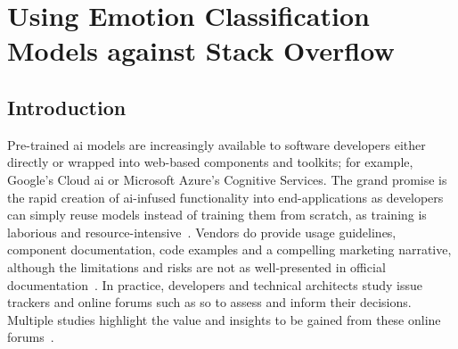 \chapter[Using Emotion Classification Models against Stack Overlow]
{Using Emotion Classification Models against Stack Overflow}
\label{ch:caise2021}
\graphicspath{{mainmatter/publications/figures/caise2021/}}

\glsresetall
\begin{abstract}
Pre-trained \gls{ai} models are increasingly available as  and tool-kits to software developers, making complex \gls{ai}-enabled functionality available via standard and well-understood methods. However, reusing such models comes with risks relating to the lack of transparency of the model and training data bias, making it difficult to confidently employ the toolkit in a new situation.  Vendors are responding and proposing artefacts such as model cards and datasheets to make models and their training more transparent.  But is this enough?  As part of an empirical investigation determining if a cloud-based \glspl{iws} was ready for production use, we processed developer questions on  using a published pre-trained classifier that was specifically tuned for the software engineering domain. In this paper, we present lessons learnt from this automation effort. We found unexpected results which led us to delve into model and training data---an option available to us because the information was available for research.  We found that, had a model card and datasheet been prepared, we could have identified risks to our study much earlier on. However, model cards and datasheet specifications are not yet mature enough and additional tools and processes are still required to confirm a decision whether a trained model can be reused with confidence.
\end{abstract}
\glsresetall

\section{Introduction}
Pre-trained \gls{ai} models are increasingly available to software developers either directly or wrapped into web-based components and toolkits; for example, Google's Cloud \gls{ai} or Microsoft Azure's Cognitive Services. The grand promise is the rapid creation of \gls{ai}-infused functionality into end-applications as developers can simply reuse models instead of training them from scratch, as training is laborious and resource-intensive~\citep{RamanAnandHoder2015}. Vendors do provide usage guidelines, component documentation, code examples and a compelling marketing narrative, although the limitations and risks are not as well-presented in  official documentation~\citep{Cummaudo:2019icsme,Cummaudo:2020icse}. 
In practice, developers and technical architects study issue trackers and online forums such as \gls{so} to assess and inform their decisions.  Multiple studies highlight the value and insights to be gained from these online forums~\citep{Abdalkareem2017WhatOverflow,Storey2014,Cummaudo:2020icse}.

